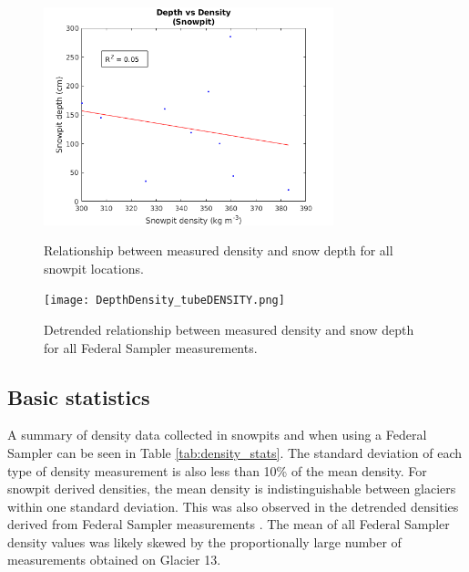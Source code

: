 \documentclass[12pt]{article}
\begin{document}
\begin{figure} 
	\centering
	\includegraphics[width = 0.75\textwidth]{DepthDensity_SP.png}\\
	\caption{Relationship between measured density and snow depth for all snowpit locations.}
	\label{fig:pit_depth}
\end{figure}

\begin{figure} 
	\centering
	\texttt{[image: DepthDensity\_tubeDENSITY.png]}\\
	\caption{Detrended relationship between measured density and snow depth for all Federal Sampler measurements.}
	\label{fig:tube_depthDETREND}
\end{figure}


\subsection*{Basic statistics}

A summary of density data collected in snowpits and when using a Federal Sampler can be seen in Table \ref{tab:density_stats}. The standard deviation of each type of density measurement is also less than 10\% of the mean density. For snowpit derived densities, the mean density is indistinguishable between glaciers within one standard deviation. This was also observed in the detrended densities derived from Federal Sampler measurements . The mean of all Federal Sampler density values was likely skewed by the proportionally large number of measurements obtained on Glacier 13.
\end{document}
